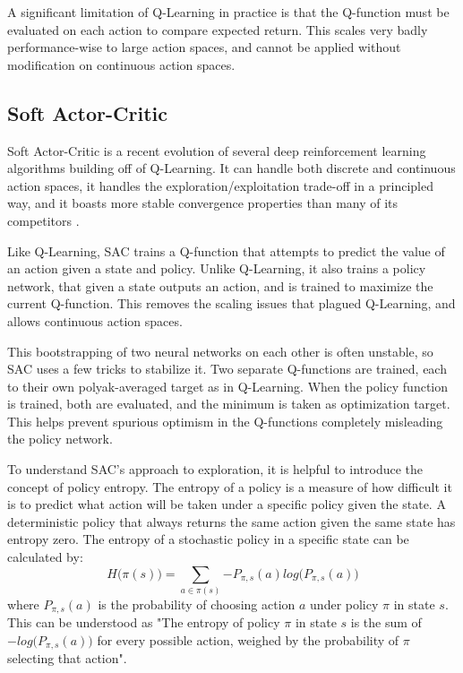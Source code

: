 A significant limitation of Q-Learning in practice is that the Q-function must be evaluated on each action to compare expected return. This scales very badly performance-wise to large action spaces, and cannot be applied without modification on continuous action spaces.



\subsection{Soft Actor-Critic}

Soft Actor-Critic is a recent evolution of several deep reinforcement learning algorithms building off of Q-Learning. It can handle both discrete and continuous action spaces, it handles the exploration/exploitation trade-off in a principled way, and it boasts more stable convergence properties than many of its competitors \cite{SAC_main}.

Like Q-Learning, SAC trains a Q-function that attempts to predict the value of an action given a state and policy. Unlike Q-Learning, it also trains a policy network, that given a state outputs an action, and is trained to maximize the current Q-function. This removes the scaling issues that plagued Q-Learning, and allows continuous action spaces.

This bootstrapping of two neural networks on each other is often unstable, so SAC uses a few tricks to stabilize it. Two separate Q-functions are trained, each to their own polyak-averaged target as in Q-Learning. When the policy function is trained, both are evaluated, and the minimum is taken as optimization target. This helps prevent spurious optimism in the Q-functions completely misleading the policy network.

To understand SAC's approach to exploration, it is helpful to introduce the concept of policy entropy. The entropy of a policy is a measure of how difficult it is to predict what action will be taken under a specific policy given the state. A deterministic policy that always returns the same action given the same state has entropy zero. The entropy of a stochastic policy in a specific state can be calculated by:
\begin{equation}
    H\big(\pi(s)\big) = \sum_{a \in \pi(s)}{-P_{\pi, s}(a) log\big(P_{\pi, s}(a)\big)}
\end{equation} where $P_{\pi, s}(a)$ is the probability of choosing action $a$ under policy $\pi$ in state $s$. This can be understood as "The entropy of policy $\pi$ in state $s$ is the sum of $-log\big(P_{\pi, s}(a)\big)$ for every possible action, weighed by the probability of $\pi$ selecting that action".

